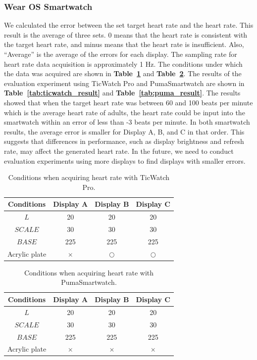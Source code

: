 \documentclass[sigchi,authordraft]{acmart}
\newcommand\tabref[1]{\textbf{Table~\ref{tab:#1}}}
\begin{document}
\subsubsection{Wear OS Smartwatch}
We calculated the error between the set target heart rate and the heart rate. This result is the average of three sets. 0 means that the heart rate is consistent with the target heart rate, and minus means that the heart rate is insufficient. Also, ``Average'' is the average of the errors for each display. The sampling rate for heart rate data acquisition is approximately 1 Hz. The conditions under which the data was acquired are shown in \tabref{ticwatch_params} and \tabref{puma_params}. The results of the evaluation experiment using TicWatch Pro and PumaSmartwatch are shown in \tabref{ticwatch_result} and \tabref{puma_result}. The results showed that when the target heart rate was between 60 and 100 beats per minute which is the average heart rate of adults, the heart rate could be input into the smartwatch within an error of less than -3 beats per minute. In both smartwatch results, the average error is smaller for Display A, B, and C in that order. This suggests that differences in performance, such as display brightness and refresh rate, may affect the generated heart rate. In the future, we need to conduct evaluation experiments using more displays to find displays with smaller errors.

\begin{table}[!t]
  \centering
  \caption{Conditions when acquiring heart rate with TicWatch Pro.}
  \begin{tabular}{c|c|c|c} \hline\hline
    Conditions & Display A & Display B & Display C \\ \hline
    $L$ & 20 & 20 & 20 \\
    $SCALE$ & 30 & 30 & 30 \\
    $BASE$ & 225 & 225 & 225 \\
    Acrylic plate & $\times$ & $\bigcirc$ & $\bigcirc$ \\ \hline
  \end{tabular}
  \label{tab:ticwatch_params}
\end{table}

\begin{table}[!t]
  \centering
  \caption{Conditions when acquiring heart rate with PumaSmartwatch.}
  \begin{tabular}{c|c|c|c} \hline\hline
    Conditions & Display A & Display B & Display C \\ \hline
    $L$ & 20 & 20 & 20 \\
    $SCALE$ & 30 & 30 & 30 \\
    $BASE$ & 225 & 225 & 225 \\
    Acrylic plate & $\times$ & $\times$ & $\times$ \\ \hline
  \end{tabular}
  \label{tab:puma_params}
\end{table}
\end{document}
